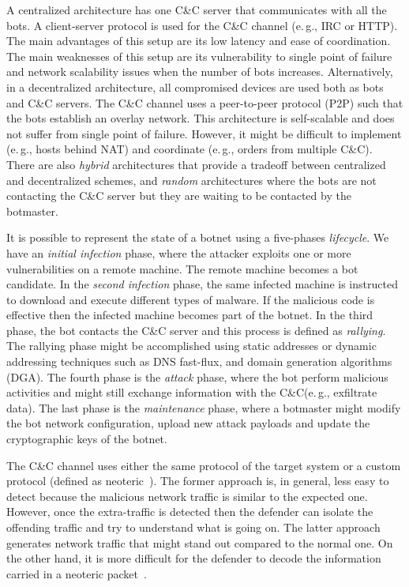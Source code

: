 \documentclass[sigconf]{acmart}
\makeatletter
\newcommand{\eg}{e.\@\,g.,\@\xspace}
\newcommand{\CC}{C\&C\@\xspace}
\makeatother
\begin{document}
A centralized architecture has one \CC server that communicates with all
the bots. A client-server protocol is used for the \CC channel (\eg IRC
or HTTP). The main advantages of this setup are its low latency and ease
of coordination. The main weaknesses of this setup are its vulnerability
to single point of failure and network scalability issues when the number
of bots increases. Alternatively, in a decentralized architecture, all
compromised devices are used both as bots and \CC servers. The \CC channel
uses a peer-to-peer protocol (P2P) such that the bots establish an overlay
network. This architecture is self-scalable and does not suffer from single
point of failure. However, it might be difficult to implement (\eg hosts
behind NAT) and coordinate (\eg orders from multiple \CC). There are also
\emph{hybrid} architectures that provide a tradeoff between centralized and
decentralized schemes, and \emph{random} architectures where the bots are
not contacting the \CC server but they are waiting to be contacted by the
botmaster.

It is possible to represent the state of a botnet using a five-phases
\emph{lifecycle}. We have an \emph{initial infection}
phase, where the attacker exploits one or more vulnerabilities on a remote
machine. The remote machine becomes a bot candidate. In the \emph{second
infection} phase, the same infected machine is instructed to download and
execute different types of malware. If the malicious code is effective
then the infected machine becomes part of the botnet. In the third phase,
the bot contacts the \CC server and this process is defined as
\emph{rallying}. The rallying phase might be accomplished using static
addresses or dynamic addressing techniques such as DNS fast-flux, and domain
generation algorithms (DGA). The fourth
phase is the \emph{attack} phase, where the bot perform malicious activities
and might still exchange information with the \CC (\eg exfiltrate data). The
last phase is the \emph{maintenance} phase, where a botmaster might
modify the bot network configuration, upload new attack payloads and update
the cryptographic keys of the botnet.

The \CC channel uses either the same protocol of the target system or a custom
protocol (defined as neoteric~\cite{vormayr2017botnet}). The former
approach is, in general, less easy to detect because the malicious network
traffic is similar to the expected one. However, once the extra-traffic is
detected then the defender can isolate the offending traffic and try to
understand what is going on. The latter approach generates network traffic
that might stand out compared to the normal one. On the other hand, it is more
difficult for the defender to decode the information carried in a neoteric
packet~\cite{khattak2014taxonomy}.
\end{document}
